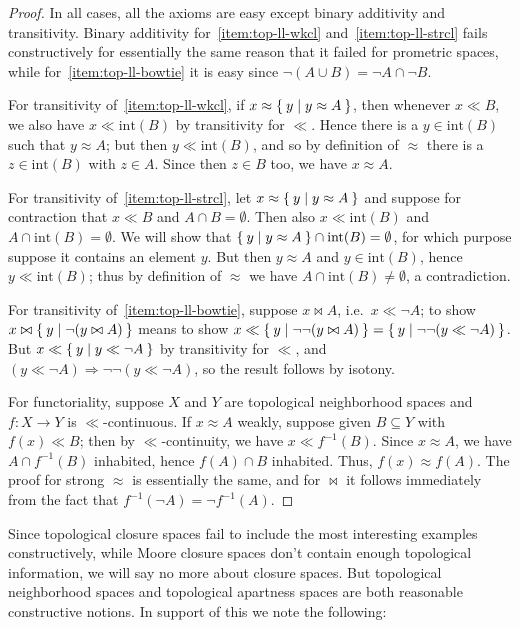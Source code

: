 \documentclass{article}
\def\int{\mathrm{int}}
\def\cpl#1{\neg #1}
\let\implies\Rightarrow
\def\inv{^{-1}}
\begin{document}
\begin{proof}
  In all cases, all the axioms are easy except binary additivity and transitivity.
  Binary additivity for~\ref{item:top-ll-wkcl} and~\ref{item:top-ll-strcl} fails constructively for essentially the same reason that it failed for prometric spaces, while for~\ref{item:top-ll-bowtie} it is easy since $\cpl{(A\cup B)} = \cpl{A} \cap \cpl{B}$.

  For transitivity of~\ref{item:top-ll-wkcl}, if $x\approx \Set{y | y\approx A}$, then whenever $x\ll B$, we also have $x\ll \int(B)$ by transitivity for $\ll$.
  Hence there is a $y\in \int(B)$ such that $y\approx A$; but then $y\ll \int(B)$, and so by definition of $\approx$ there is a $z\in\int(B)$ with $z\in A$.
  Since then $z\in B$ too, we have $x\approx A$.

  For transitivity of~\ref{item:top-ll-strcl}, let $x\approx \Set{y | y\approx A}$ and suppose for contraction that $x\ll B$ and $A\cap B =\emptyset$.
  Then also $x\ll \int(B)$ and $A\cap \int(B)=\emptyset$.
  We will show that $\setof{y | y\approx A} \cap \int(B) = \emptyset$, for which purpose suppose it contains an element $y$.
  But then $y\approx A$ and $y\in \int(B)$, hence $y\ll \int(B)$; thus by definition of $\approx$ we have $A\cap \int(B) \neq \emptyset$, a contradiction.

  For transitivity of~\ref{item:top-ll-bowtie}, suppose $x\bowtie A$, i.e.\ $x\ll \cpl{A}$; to show $x\bowtie \Set{y|\neg(y\bowtie A)}$ means to show $x\ll \setof{y|\neg\neg(y\bowtie A)} = \setof{y|\neg\neg(y\ll \cpl{A})}$.
  But $x\ll \setof{y|y\ll \cpl{A}}$ by transitivity for $\ll$, and $(y\ll \cpl{A})\implies\neg\neg(y\ll\cpl{A})$, so the result follows by isotony.

  For functoriality, suppose $X$ and $Y$ are topological neighborhood spaces and $f:X\to Y$ is $\ll$-continuous.
  If $x\approx A$ weakly, suppose given $B\subseteq Y$ with $f(x)\ll B$; then by $\ll$-continuity, we have $x\ll f\inv(B)$.
  Since $x\approx A$, we have $A\cap f\inv(B)$ inhabited, hence $f(A) \cap B$ inhabited.
  Thus, $f(x)\approx f(A)$.
  The proof for strong $\approx$ is essentially the same, and for $\bowtie$ it follows immediately from the fact that $f\inv(\cpl{A}) = \cpl{f\inv(A)}$.
\end{proof}

Since topological closure spaces fail to include the most interesting examples constructively, while Moore closure spaces don't contain enough topological information, we will say no more about closure spaces.
But topological neighborhood spaces and topological apartness spaces are both reasonable constructive notions.
In support of this we note the following:
\end{document}
